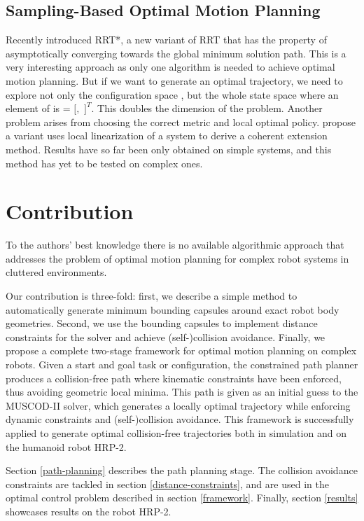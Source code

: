 \subsection{Sampling-Based Optimal Motion Planning}

Recently \cite{Karaman2011} introduced RRT*, a new variant of RRT that
has the property of asymptotically converging towards the global
minimum solution path. This is a very interesting approach as only one
algorithm is needed to achieve optimal motion planning. But if we want
to generate an optimal trajectory, we need to explore not only the
configuration space \cspace, but the whole state space
\sspace\thinspace where an element of \sspace\enspace is \state{} =
$[$\config{}$,$ \dotconfig{}$]^T$. This doubles the dimension of the
problem. Another problem arises from choosing the correct metric and
local optimal policy. \cite{Perez2012} propose a variant uses local
linearization of a system to derive a coherent extension
method. Results have so far been only obtained on simple systems, and
this method has yet to be tested on complex ones.

\section{Contribution}
To the authors' best knowledge there is no available algorithmic
approach that addresses the problem of optimal motion planning for
complex robot systems in cluttered environments.

Our contribution is three-fold: first, we describe a simple method to
automatically generate minimum bounding capsules around exact robot
body geometries. Second, we use the bounding capsules to implement
distance constraints for the solver and achieve (self-)collision
avoidance. Finally, we propose a complete two-stage framework for
optimal motion planning on complex robots. Given a start and goal task
or configuration, the constrained path planner produces a
collision-free path where kinematic constraints have been enforced,
thus avoiding geometric local minima. This path is given as an initial
guess to the \textsc{MUSCOD-II} solver, which generates a locally
optimal trajectory while enforcing dynamic constraints and
(self-)collision avoidance. This framework is successfully applied to
generate optimal collision-free trajectories both in simulation and on
the humanoid robot HRP-2.

Section \ref{path-planning} describes the path planning stage. The
collision avoidance constraints are tackled in section
\ref{distance-constraints}, and are used in the optimal control
problem described in section \ref{framework}. Finally, section
\ref{results} showcases results on the robot HRP-2.

